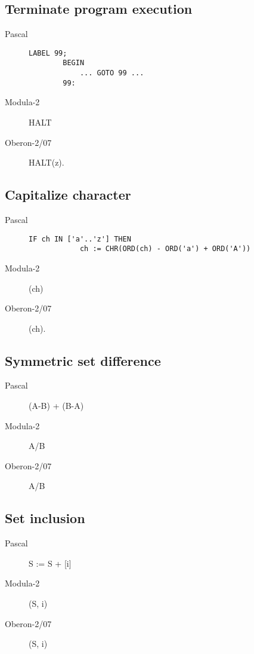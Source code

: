 \documentclass[10pt]{article}
\begin{document}
\subsection{Terminate program execution}
\begin{description}
    \item[Pascal] 
        \begin{lstlisting}[style=example]   
        LABEL 99;
        BEGIN
            ... GOTO 99 ...
        99: 
        \end{lstlisting}
    
    \item[Modula-2] HALT
    
    \item[Oberon-2/07] HALT(z).
\end{description}

\subsection{Capitalize character}
\begin{description}
    \item[Pascal] 
     
        \begin{lstlisting}[style=example]   
        IF ch IN ['a'..'z'] THEN 
            ch := CHR(ORD(ch) - ORD('a') + ORD('A'))
        \end{lstlisting}
    
    \item[Modula-2] \CAP(ch)
    
    \item[Oberon-2/07] \CAP(ch).
\end{description}

\subsection{Symmetric set difference}
\begin{description}
    \item[Pascal]  (A-B) + (B-A)
    
    \item[Modula-2] A/B
    
    \item[Oberon-2/07] A/B
\end{description}

\subsection{Set inclusion}
\begin{description}
    \item[Pascal]  S := S + [i]
    
    \item[Modula-2] \INCL(S, i)
    
    \item[Oberon-2/07] \INCL(S, i)
\end{description}
\end{document}
